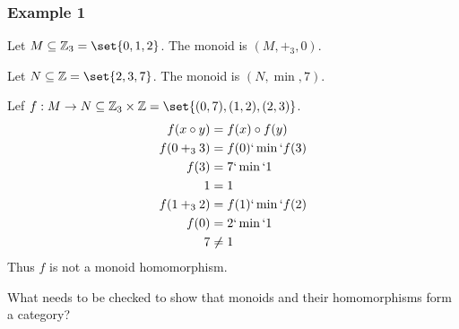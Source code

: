 \subsubsection{Example 1}
\begin{proofitem}
	\item Let $M\subseteq\mathbb{Z}_3=\set{0, 1, 2}$. The monoid is $(M, +_3, 0)$.
	\item Let $N\subseteq\mathbb{Z}=\set{2, 3, 7}$.
	The monoid is $(N, \min, 7)$.
	\item Lef $f: M \rightarrow N\subseteq \mathbb{Z}_3\times\mathbb{Z}=\set{(0, 7),
			(1, 2), (2, 3)}$.
	\begin{align*}
		f(x\circ y) & = f(x)\circ f(y)  \\
		f(0 +_3 3)  & = f(0)`\min` f(3) \\
		f(3)        & = 7`\min` 1       \\
		1           & = 1               \\
		f(1 +_3 2)  & = f(1)`\min` f(2) \\
		f(0)        & = 2`\min` 1       \\
		7           & \neq 1
	\end{align*}
	Thus $f$ is not a monoid homomorphism.
\end{proofitem}
\clearpage
\begin{ttta}
	What needs to be checked to show that monoids and their homomorphisms form
	a category?
\end{ttta}
